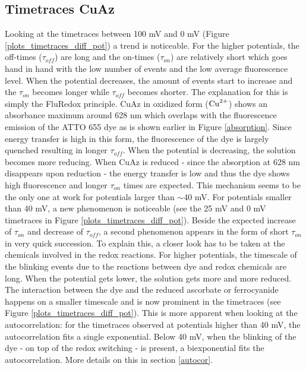 \documentclass[twoside,single]{lion-msc}
\begin{document}
\subsection{Timetraces CuAz}

Looking at the timetraces between 100 mV and 0 mV (Figure \ref{plots_timetraces_diff_pot}) a trend is noticeable. For the higher potentials, the off-times ($\tau_{off}$) are long and the on-times ($\tau_{on}$) are relatively short which goes hand in hand with the low number of events and the low average fluorescence level. When the potential decreases, the amount of events start to increase and the $\tau_{on}$ becomes longer while $\tau_{off}$ becomes shorter. The explanation for this is simply the FluRedox principle. CuAz in oxidized form ($\textup{Cu}^{2+}$) shows an absorbance maximum around 628 nm which overlaps with the fluorescence emission of the ATTO 655 dye as is shown earlier in Figure \ref{absorption}. Since energy transfer is high in this form, the fluorescence of the dye is largely quenched resulting in longer $\tau_{off}$. When the potential is decreasing, the solution becomes more reducing. When CuAz is reduced - since the absorption at 628 nm disappears upon reduction - the energy transfer is low and thus the dye shows high fluorescence and longer $\tau_{on}$ times are expected. This mechanism seems to be the only one at work for potentials larger than $\sim$40 mV. For potentials smaller than 40 mV, a new phenomenon is noticeable (see the 25 mV and 0 mV timetraces in Figure \ref{plots_timetraces_diff_pot}). Beside the expected  increase of $\tau_{on}$ and decrease of $\tau_{off}$, a second phenomenon appears in the form of short $\tau_{on}$ in very quick succession. To explain this, a closer look has to be taken at the chemicals involved in the redox reactions. For higher potentials, the timescale of the blinking events due to the reactions between dye and redox chemicals are long. When the potential gets lower, the solution gets more and more reduced. The interaction between the dye and the reduced ascorbate or ferrocyanide happens on a smaller timescale and is now prominent in the timetraces (see Figure \ref{plots_timetraces_diff_pot}). This is more apparent when looking at the autocorrelation: for the timetraces observed at potentials higher than 40 mV, the autocorrelation fits a single exponential. Below 40 mV, when the blinking of the dye - on top of the redox switching - is present, a biexponential fits the autocorrelation. More details on this in section \ref{autocor}.
\end{document}
